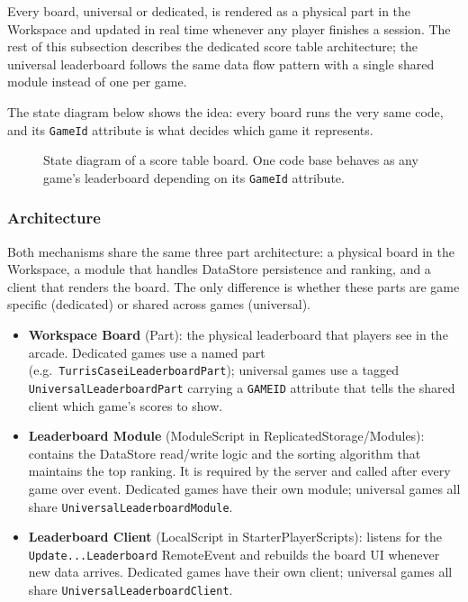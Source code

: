 \documentclass[12pt,letterpaper]{article}
\begin{document}
Every board, universal or dedicated, is rendered as a physical part in the Workspace and updated in real time whenever any player finishes a session. The rest of this subsection describes the dedicated score table architecture; the universal leaderboard follows the same data flow pattern with a single shared module instead of one per game.

The state diagram below shows the idea: every board runs the very same code, and its \texttt{GameId} attribute is what decides which game it represents.

\begin{figure}[H]
  \centering
  
  \caption{State diagram of a score table board. One code base behaves as any game's leaderboard depending on its \texttt{GameId} attribute.}
  \label{fig:scoretable_states}
\end{figure}

\subsubsection{Architecture}

Both mechanisms share the same three part architecture: a physical board in the Workspace, a module that handles DataStore persistence and ranking, and a client that renders the board. The only difference is whether these parts are game specific (dedicated) or shared across games (universal).

\begin{itemize}
  \item \textbf{Workspace Board} (Part): the physical leaderboard that players see in the arcade. Dedicated games use a named part (e.g.\ \texttt{TurrisCaseiLeaderboardPart}); universal games use a tagged \texttt{UniversalLeaderboardPart} carrying a \texttt{GAMEID} attribute that tells the shared client which game's scores to show.
  \item \textbf{Leaderboard Module} (ModuleScript in ReplicatedStorage/Modules): contains the DataStore read/write logic and the sorting algorithm that maintains the top ranking. It is required by the server and called after every game over event. Dedicated games have their own module; universal games all share \texttt{UniversalLeaderboardModule}.
  \item \textbf{Leaderboard Client} (LocalScript in StarterPlayerScripts): listens for the \texttt{Update...Leaderboard} RemoteEvent and rebuilds the board UI whenever new data arrives. Dedicated games have their own client; universal games all share \texttt{UniversalLeaderboardClient}.
\end{itemize}
\end{document}
